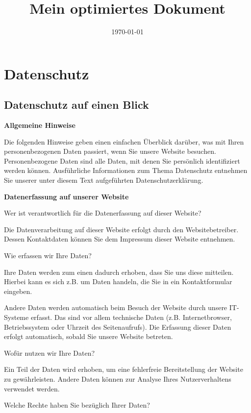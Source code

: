 \documentclass[12pt,a4paper]{scrartcl}
\title{Mein optimiertes Dokument}
\date{\today}
\begin{document}
\maketitle

\hypertarget{datenschutz}{%
\section{Datenschutz}\label{datenschutz}}

\hypertarget{datenschutz-auf-einen-blick}{%
\subsection{Datenschutz auf einen
Blick}\label{datenschutz-auf-einen-blick}}

\textbf{Allgemeine Hinweise}

Die folgenden Hinweise geben einen einfachen Überblick darüber, was mit
Ihren personenbezogenen Daten passiert, wenn Sie unsere Website
besuchen. Personenbezogene Daten sind alle Daten, mit denen Sie
persönlich identifiziert werden können. Ausführliche Informationen zum
Thema Datenschutz entnehmen Sie unserer unter diesem Text aufgeführten
Datenschutzerklärung.

\textbf{Datenerfassung auf unserer Website}

Wer ist verantwortlich für die Datenerfassung auf dieser Website?

Die Datenverarbeitung auf dieser Website erfolgt durch den
Websitebetreiber. Dessen Kontaktdaten können Sie dem Impressum dieser
Website entnehmen.

Wie erfassen wir Ihre Daten?

Ihre Daten werden zum einen dadurch erhoben, dass Sie uns diese
mitteilen. Hierbei kann es sich z.B. um Daten handeln, die Sie in ein
Kontaktformular eingeben.

Andere Daten werden automatisch beim Besuch der Website durch unsere
IT-Systeme erfasst. Das sind vor allem technische Daten (z.B.
Internetbrowser, Betriebssystem oder Uhrzeit des Seitenaufrufs). Die
Erfassung dieser Daten erfolgt automatisch, sobald Sie unsere Website
betreten.

Wofür nutzen wir Ihre Daten?

Ein Teil der Daten wird erhoben, um eine fehlerfreie Bereitstellung der
Website zu gewährleisten. Andere Daten können zur Analyse Ihres
Nutzerverhaltens verwendet werden.

Welche Rechte haben Sie bezüglich Ihrer Daten?
\end{document}
